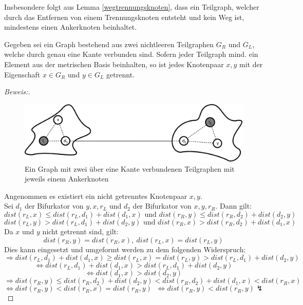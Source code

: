 \begin{bem}
Insbesondere folgt aus Lemma \ref{wegtrennungsknoten}, dass ein Teilgraph, welcher durch das Entfernen von einem Trennungsknoten entsteht und kein Weg ist, mindestens einen Ankerknoten beinhaltet.
\end{bem}
\begin{lem}
\label{second_theorem}
Gegeben sei ein Graph bestehend aus zwei nichtleeren Teilgraphen $G_R$ und $G_L$, welche durch genau eine Kante verbunden sind. Sofern jeder Teilgraph mind. ein Element aus der metrischen Basis beinhalten, so ist jedes Knotenpaar $x,y$ mit der Eigenschaft $x \in G_R$ und $y \in G_L$ getrennt.
\end{lem}
\vspace{-4mm}
\begin{proof}[Beweis:] ~
\vspace{-2mm}
\begin{figure}[h!]
		\centering 		 
  \includegraphics[width=360pt]{bilder/bew5.pdf}
	\caption{Ein Graph mit zwei über eine Kante verbundenen Teilgraphen mit jeweils einem Ankerknoten}
\vspace{-2mm}
  	 \end{figure}
  Angenommen es existiert ein nicht getrenntes Knotenpaar $x,y$.\\Sei $d_1$ der Bifurkator von $y,x,r_L$ und $d_2$ der Bifurkator von $x,y,r_R$. Dann gilt: $$dist(r_L,x) \leq dist(r_L,d_1)+ dist(d_1,x)\text{ und }dist(r_R,y) \leq dist(r_R,d_2)+ dist(d_2,y)$$ $$dist(r_L,y) > dist(r_L,d_1)+ dist(d_2,y)\text{ und }dist(r_R,x) > dist(r_R,d_2)+ dist(d_1,x)$$
  Da $x$ und $y$ nicht getrennt sind, gilt:
   $$dist(r_R,y) =dist(r_R,x),\: dist(r_L,x) = dist(r_L,y)$$ Dies kann eingesetzt und umgeformt werden zu dem folgenden Widerspruch:
  $$\Rightarrow dist(r_L,d_1)+ dist(d_1,x) \geq dist(r_L,x) = dist(r_L,y)> dist(r_L,d_1)+ dist(d_2,y)$$
  $$\Leftrightarrow dist(r_L,d_1)+ dist(d_1,x) > dist(r_L,d_1)+ dist(d_2,y)$$
  $$\Leftrightarrow dist(d_1,x) >  dist(d_2,y)$$
  $$\Rightarrow dist(r_R,y) \leq dist(r_R,d_2)+ dist(d_2,y) < dist(r_R,d_2) + dist(d_1,x) < dist(r_R,x)$$
  $$\Leftrightarrow dist(r_R,y) < dist(r_R,x) = dist(r_R,y)\;\;\Leftrightarrow dist(r_R,y) < dist(r_R,y) \lightning $$
 \vspace{-4mm}
  \end{proof}

